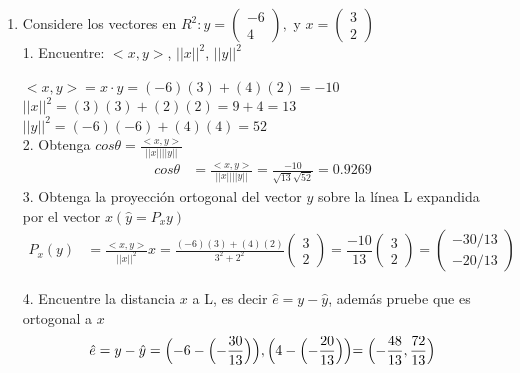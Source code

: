 \documentclass[12pt,a4paper]{report}
\author{Guadalupe Monroy}
\begin{document}

\begin{enumerate}
\item Considere los vectores en $R^2: y= \begin{pmatrix} -6 \\  4 \end{pmatrix},$ y $x = \begin{pmatrix} 3 \\  2 \end{pmatrix}$ \\ 

1. Encuentre: $<x,y>$, $||x||^2$, $||y||^2$

$<x,y> = x \cdot y = (-6)(3)+(4)(2)= -10$\\

$||x||^2 = (3)(3)+(2)(2) = 9 + 4 = 13$\\

$||y||^2 = (-6)(-6)+(4)(4) = 52$\\

2. Obtenga $cos \theta = \frac{<x,y>}{||x|| ||y||}$\\
\begin{align*}
    cos \theta & = \frac{<x,y>}{||x|| ||y||} = \frac{-10}{\sqrt{13} \sqrt{52}} = 0.9269
\end{align*}
3. Obtenga la proyección ortogonal del vector $y$ sobre la línea L expandida por el vector $x(\hat{y} = P_xy)$
\begin{align*}
    P_x (y) & = \frac{<x,y>}{||x||^2} x = \frac{(-6)(3)+(4)(2)}{3^2 + 2^2} \begin{pmatrix}
    3\\
    2
    \end{pmatrix} = \dfrac{-10}{13}\begin{pmatrix}
    3\\
    2
    \end{pmatrix} =\begin{pmatrix}
    -30/13\\
    -20/13
    \end{pmatrix}  
\end{align*}

4. Encuentre la distancia $x$ a L, es decir $\hat{e} =y -\hat{y}$, además pruebe que es ortogonal a $x$\\
\begin{align*}
   \hat{e} = y - \hat{y} = \Bigl(-6-\Bigl(-\frac{30}{13}\Bigl)\Bigl), \Bigl(4-\Bigl(-\frac{20}{13}\Bigl)\Bigl) =  \Bigl(- \frac{48}{13}, \frac{72}{13} \Bigl) 
\end{align*}


\end{enumerate}
\end{document}
